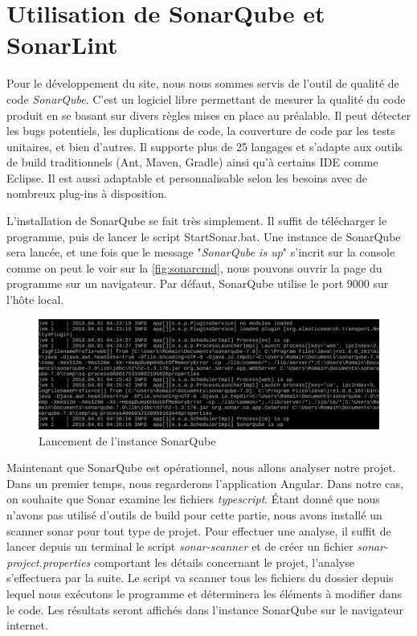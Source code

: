 \documentclass{polytech/polytech}
\begin{document}
\section{Utilisation de SonarQube et SonarLint}

Pour le développement du site, nous nous sommes servis de l'outil de qualité de code \textit{SonarQube}. C'est un logiciel libre permettant de mesurer la qualité du code produit en se basant sur divers règles mises en place au préalable. Il peut détecter les bugs potentiels, les duplications de code, la couverture de code par les tests unitaires, et bien d'autres. Il supporte plus de 25 langages et s'adapte aux outils de build traditionnels (Ant, Maven, Gradle) ainsi qu'à certains IDE comme Eclipse. Il est aussi adaptable et personnalisable selon les besoins avec de nombreux plug-ins à disposition.

L'installation de SonarQube se fait très simplement. Il suffit de télécharger le programme, puis de lancer le script StartSonar.bat. Une instance de SonarQube sera lancée, et une fois que le message "\textit{SonarQube is up}" s'incrit sur la console comme on peut le voir sur la \autoref{fig:sonarcmd}, nous pouvons ouvrir la page du programme sur un navigateur. Par défaut, SonarQube utilise le port 9000 sur l'hôte local.


\begin{figure}
	\includegraphics[scale=0.6]{sonarcmd.png}
	\caption{Lancement de l'instance SonarQube}
	\label{fig:sonarcmd}
\end{figure}


Maintenant que SonarQube est opérationnel, nous allons analyser notre projet. Dans un premier temps, nous regarderons l'application Angular. Dans notre cas, on souhaite que Sonar examine les fichiers \textit{typescript}. \'{E}tant donné que nous n'avons pas utilisé d'outils de build pour cette partie, nous avons installé un scanner sonar pour tout type de projet. Pour effectuer une analyse, il suffit de lancer depuis un terminal le script \textit{sonar-scanner} et de créer un fichier \textit{sonar-project.properties} comportant les détails concernant le projet, l'analyse s'effectuera par la suite. Le script va scanner tous les fichiers du dossier depuis lequel nous exécutons le programme et déterminera les éléments à modifier dans le code. Les résultats seront affichés dans l'instance SonarQube sur le navigateur internet.
\end{document}
